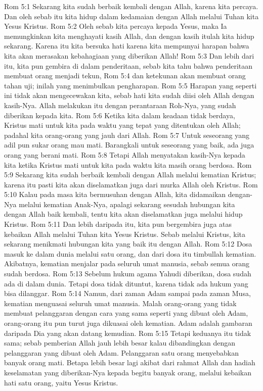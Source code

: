 Rom 5:1  Sekarang kita sudah berbaik kembali dengan Allah, karena kita percaya. Dan oleh sebab itu kita hidup dalam kedamaian dengan Allah melalui Tuhan kita Yesus Kristus.
Rom 5:2  Oleh sebab kita percaya kepada Yesus, maka Ia memungkinkan kita menghayati kasih Allah, dan dengan kasih itulah kita hidup sekarang. Karena itu kita bersuka hati karena kita mempunyai harapan bahwa kita akan merasakan kebahagiaan yang diberikan Allah!
Rom 5:3  Dan lebih dari itu, kita pun gembira di dalam penderitaan, sebab kita tahu bahwa penderitaan membuat orang menjadi tekun,
Rom 5:4  dan ketekunan akan membuat orang tahan uji; inilah yang menimbulkan pengharapan.
Rom 5:5  Harapan yang seperti ini tidak akan mengecewakan kita, sebab hati kita sudah diisi oleh Allah dengan kasih-Nya. Allah melakukan itu dengan perantaraan Roh-Nya, yang sudah diberikan kepada kita.
Rom 5:6  Ketika kita dalam keadaan tidak berdaya, Kristus mati untuk kita pada waktu yang tepat yang ditentukan oleh Allah; padahal kita orang-orang yang jauh dari Allah.
Rom 5:7  Untuk seseorang yang adil pun sukar orang mau mati. Barangkali untuk seseorang yang baik, ada juga orang yang berani mati.
Rom 5:8  Tetapi Allah menyatakan kasih-Nya kepada kita ketika Kristus mati untuk kita pada waktu kita masih orang berdosa.
Rom 5:9  Sekarang kita sudah berbaik kembali dengan Allah melalui kematian Kristus; karena itu pasti kita akan diselamatkan juga dari murka Allah oleh Kristus.
Rom 5:10  Kalau pada masa kita bermusuhan dengan Allah, kita didamaikan dengan-Nya melalui kematian Anak-Nya, apalagi sekarang sesudah hubungan kita dengan Allah baik kembali, tentu kita akan diselamatkan juga melalui hidup Kristus.
Rom 5:11  Dan lebih daripada itu, kita pun bergembira juga atas kebaikan Allah melalui Tuhan kita Yesus Kristus. Sebab melalui Kristus, kita sekarang menikmati hubungan kita yang baik itu dengan Allah.
Rom 5:12  Dosa masuk ke dalam dunia melalui satu orang, dan dari dosa itu timbullah kematian. Akibatnya, kematian menjalar pada seluruh umat manusia, sebab semua orang sudah berdosa.
Rom 5:13  Sebelum hukum agama Yahudi diberikan, dosa sudah ada di dalam dunia. Tetapi dosa tidak dituntut, karena tidak ada hukum yang bisa dilanggar.
Rom 5:14  Namun, dari zaman Adam sampai pada zaman Musa, kematian menguasai seluruh umat manusia. Malah orang-orang yang tidak membuat pelanggaran dengan cara yang sama seperti yang dibuat oleh Adam, orang-orang itu pun turut juga dikuasai oleh kematian. Adam adalah gambaran daripada Dia yang akan datang kemudian.
Rom 5:15  Tetapi keduanya itu tidak sama; sebab pemberian Allah jauh lebih besar kalau dibandingkan dengan pelanggaran yang dibuat oleh Adam. Pelanggaran satu orang menyebabkan banyak orang mati. Betapa lebih besar lagi akibat dari rahmat Allah dan hadiah keselamatan yang diberikan-Nya kepada begitu banyak orang, melalui kebaikan hati satu orang, yaitu Yesus Kristus.
